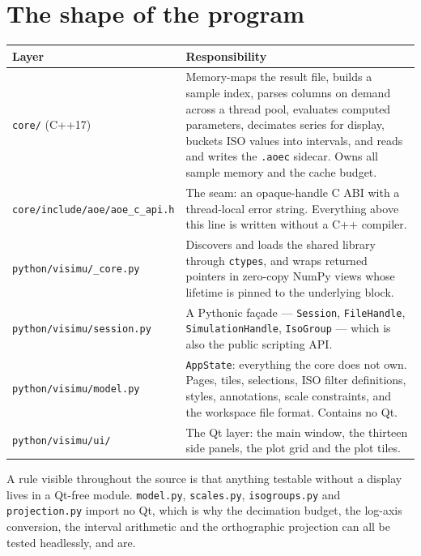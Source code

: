 \documentclass[11pt,a4paper,oneside]{report}
\newcommand{\code}[1]{\texttt{#1}}
\begin{document}
\section{The shape of the program}

\begin{center}
\small
\begin{tabular}{@{}p{}p{}@{}}
\toprule
\textbf{Layer} & \textbf{Responsibility} \\
\midrule
\code{core/} (C++17) &
  Memory-maps the result file, builds a sample index, parses columns on demand
  across a thread pool, evaluates computed parameters, decimates series for
  display, buckets ISO values into intervals, and reads and writes the
  \code{.aoec} sidecar. Owns all sample memory and the cache budget. \\
\addlinespace
\code{core/include/aoe/aoe\_c\_api.h} &
  The seam: an opaque-handle C ABI with a thread-local error string. Everything
  above this line is written without a C++ compiler. \\
\addlinespace
\code{python/visimu/\_core.py} &
  Discovers and loads the shared library through \code{ctypes}, and wraps
  returned pointers in zero-copy NumPy views whose lifetime is pinned to the
  underlying block. \\
\addlinespace
\code{python/visimu/session.py} &
  A Pythonic fa\c{c}ade --- \code{Session}, \code{FileHandle},
  \code{SimulationHandle}, \code{IsoGroup} --- which is also the public
  scripting API. \\
\addlinespace
\code{python/visimu/model.py} &
  \code{AppState}: everything the core does not own. Pages, tiles, selections,
  ISO filter definitions, styles, annotations, scale constraints, and the
  workspace file format. Contains no Qt. \\
\addlinespace
\code{python/visimu/ui/} &
  The Qt layer: the main window, the thirteen side panels, the plot grid and the
  plot tiles. \\
\bottomrule
\end{tabular}
\end{center}

A rule visible throughout the source is that anything testable without a
display lives in a Qt-free module. \code{model.py}, \code{scales.py},
\code{isogroups.py} and \code{projection.py} import no Qt, which is why the
decimation budget, the log-axis conversion, the interval arithmetic and the
orthographic projection can all be tested headlessly, and are.
\end{document}
